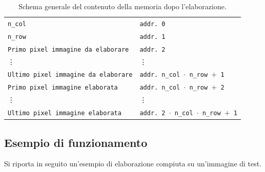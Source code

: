 \documentclass{article}
\begin{document}
\begin{table}[h]
    \centering
    \def\arraystretch{1.3} %
    \caption{Schema generale del contenuto della memoria dopo l'elaborazione.}
    \label{tab:schemamem}

    \begin{tabular}{ |m{4cm} | m{5cm} }
        \cline{1-1}
        \texttt{n\_col}                             & \texttt{addr. 0}                                     \\
        \cline{1-1}
        \texttt{n\_row}                             & \texttt{addr. 1}                                     \\
        \cline{1-1}
        \texttt{Primo pixel immagine da elaborare}  & \texttt{addr. 2}                                     \\
        \cline{1-1}
        \vdots                                      & \vdots                                               \\
        \cline{1-1}
        \texttt{Ultimo pixel immagine da elaborare} & \texttt{addr. n\_col $\cdot$ n\_row $+$ 1}           \\
        \cline{1-1}
        \texttt{Primo pixel immagine elaborata}     & \texttt{addr. n\_col $\cdot$ n\_row $+$ 2}           \\
        \cline{1-1}
        \vdots                                      & \vdots                                               \\
        \cline{1-1}
        \texttt{Ultimo pixel immagine elaborata}    & \texttt{addr. 2 $\cdot$ n\_col $\cdot$ n\_row $+$ 1} \\
        \cline{1-1}
    \end{tabular}
\end{table}
\vspace{0.3cm}

\subsection{Esempio di funzionamento} %
\label{sec:esempio}
Si riporta in seguito un'esempio di elaborazione compiuta su un'immagine di test.

\pagebreak
\end{document}
